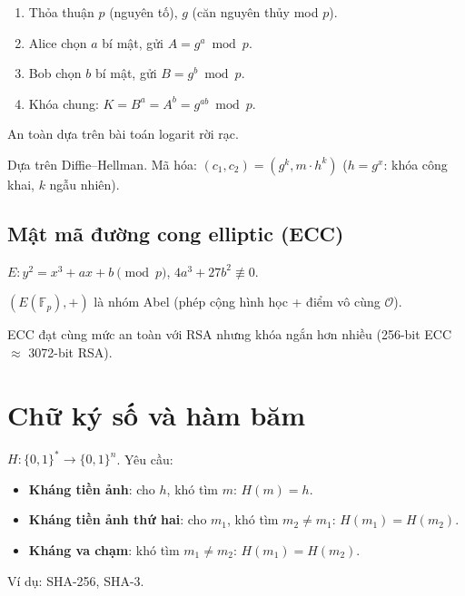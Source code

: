 \documentclass[12pt,a4paper]{article}
\begin{document}
\begin{phuongphap}[title={Trao đổi khóa Diffie--Hellman}]
  \begin{enumerate}
    \item Thỏa thuận $p$ (nguyên tố), $g$ (căn nguyên thủy mod $p$).
    \item Alice chọn $a$ bí mật, gửi $A = g^a \bmod p$.
    \item Bob chọn $b$ bí mật, gửi $B = g^b \bmod p$.
    \item Khóa chung: $K = B^a = A^b = g^{ab} \bmod p$.
  \end{enumerate}
  An toàn dựa trên bài toán logarit rời rạc.
\end{phuongphap}

\begin{phuongphap}[title={ElGamal}]
  Dựa trên Diffie--Hellman. Mã hóa: $(c_1, c_2) = (g^k, m \cdot h^k)$ ($h = g^x$: khóa công khai, $k$ ngẫu nhiên).
\end{phuongphap}

\subsection{Mật mã đường cong elliptic (ECC)}

\begin{dinhnghia}[title={Đường cong elliptic trên $\mathbb{F}_p$}]
  $E: y^2 = x^3 + ax + b \pmod{p}$, $4a^3 + 27b^2 \not\equiv 0$.

  $(E(\mathbb{F}_p), +)$ là nhóm Abel (phép cộng hình học + điểm vô cùng $\mathcal{O}$).
\end{dinhnghia}

\begin{luuy}
  ECC đạt cùng mức an toàn với RSA nhưng khóa ngắn hơn nhiều (256-bit ECC $\approx$ 3072-bit RSA).
\end{luuy}

\section{Chữ ký số và hàm băm}

\begin{dinhnghia}[title={Hàm băm (hash function)}]
  $H: \{0,1\}^* \to \{0,1\}^n$. Yêu cầu:
  \begin{itemize}
    \item \textbf{Kháng tiền ảnh}: cho $h$, khó tìm $m$: $H(m) = h$.
    \item \textbf{Kháng tiền ảnh thứ hai}: cho $m_1$, khó tìm $m_2 \ne m_1$: $H(m_1) = H(m_2)$.
    \item \textbf{Kháng va chạm}: khó tìm $m_1 \ne m_2$: $H(m_1) = H(m_2)$.
  \end{itemize}
  Ví dụ: SHA-256, SHA-3.
\end{dinhnghia}
\end{document}
